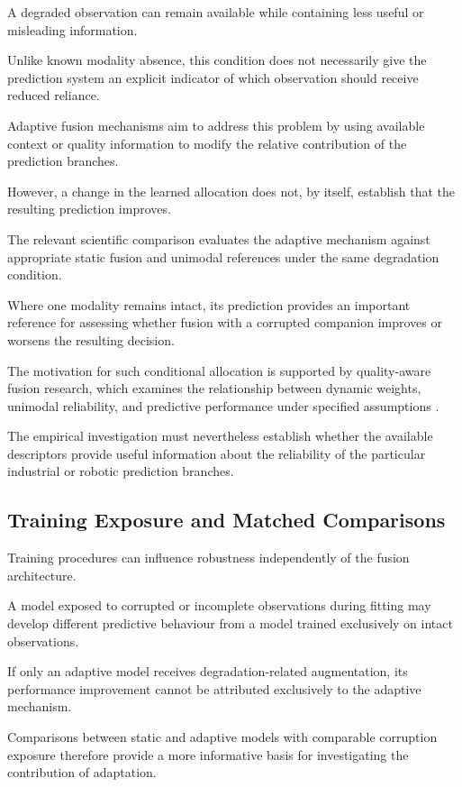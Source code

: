 A degraded observation can remain available while containing less useful or misleading information.

Unlike known modality absence, this condition does not necessarily give the prediction system an explicit indicator of which observation should receive reduced reliance.

Adaptive fusion mechanisms aim to address this problem by using available context or quality information to modify the relative contribution of the prediction branches.

However, a change in the learned allocation does not, by itself, establish that the resulting prediction improves.

The relevant scientific comparison evaluates the adaptive mechanism against appropriate static fusion and unimodal references under the same degradation condition.

Where one modality remains intact, its prediction provides an important reference for assessing whether fusion with a corrupted companion improves or worsens the resulting decision.

The motivation for such conditional allocation is supported by quality-aware fusion research, which examines the relationship between dynamic weights, unimodal reliability, and predictive performance under specified assumptions \parencite{Zhang2023QMF}.

The empirical investigation must nevertheless establish whether the available descriptors provide useful information about the reliability of the particular industrial or robotic prediction branches.

\subsection{Training Exposure and Matched Comparisons}

Training procedures can influence robustness independently of the fusion architecture.

A model exposed to corrupted or incomplete observations during fitting may develop different predictive behaviour from a model trained exclusively on intact observations.

If only an adaptive model receives degradation-related augmentation, its performance improvement cannot be attributed exclusively to the adaptive mechanism.

Comparisons between static and adaptive models with comparable corruption exposure therefore provide a more informative basis for investigating the contribution of adaptation.

